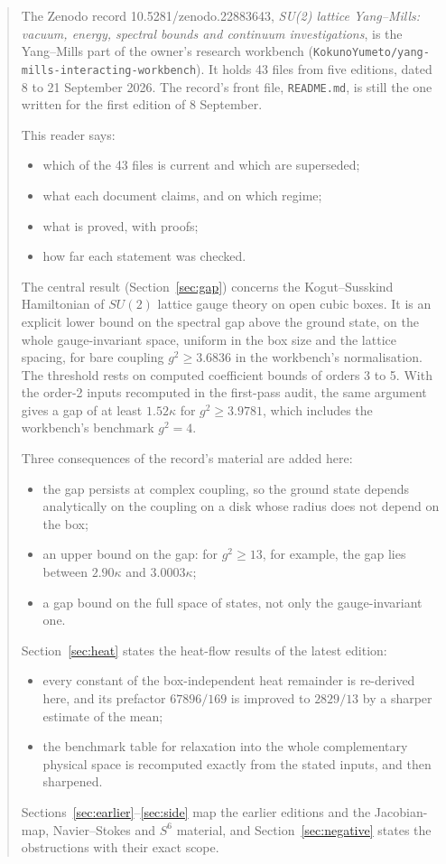 \begin{abstract}
\noindent
The Zenodo record 10.5281/zenodo.22883643, \emph{SU(2) lattice Yang--Mills: vacuum, energy, spectral bounds and continuum investigations}, is the Yang--Mills part of the owner's research workbench (\texttt{KokunoYumeto/yang-mills-interacting-workbench}). It holds 43 files from five editions, dated 8 to 21 September 2026. The record's front file, \texttt{README.md}, is still the one written for the first edition of 8 September.

This reader says:
\begin{itemize}
\item which of the 43 files is current and which are superseded;
\item what each document claims, and on which regime;
\item what is proved, with proofs;
\item how far each statement was checked.
\end{itemize}

The central result (Section~\ref{sec:gap}) concerns the Kogut--Susskind Hamiltonian of $SU(2)$ lattice gauge theory on open cubic boxes. It is an explicit lower bound on the spectral gap above the ground state, on the whole gauge-invariant space, uniform in the box size and the lattice spacing, for bare coupling $g^2\ge3.6836$ in the workbench's normalisation. The threshold rests on computed coefficient bounds of orders 3 to 5. With the order-2 inputs recomputed in the first-pass audit, the same argument gives a gap of at least $1.52\kappa$ for $g^2\ge3.9781$, which includes the workbench's benchmark $g^2=4$.

Three consequences of the record's material are added here:
\begin{itemize}
\item the gap persists at complex coupling, so the ground state depends analytically on the coupling on a disk whose radius does not depend on the box;
\item an upper bound on the gap: for $g^2\ge13$, for example, the gap lies between $2.90\kappa$ and $3.0003\kappa$;
\item a gap bound on the full space of states, not only the gauge-invariant one.
\end{itemize}

Section~\ref{sec:heat} states the heat-flow results of the latest edition:
\begin{itemize}
\item every constant of the box-independent heat remainder is re-derived here, and its prefactor $67896/169$ is improved to $2829/13$ by a sharper estimate of the mean;
\item the benchmark table for relaxation into the whole complementary physical space is recomputed exactly from the stated inputs, and then sharpened.
\end{itemize}
Sections~\ref{sec:earlier}--\ref{sec:side} map the earlier editions and the Jacobian-map, Navier--Stokes and $S^6$ material, and Section~\ref{sec:negative} states the obstructions with their exact scope.


\end{abstract}
